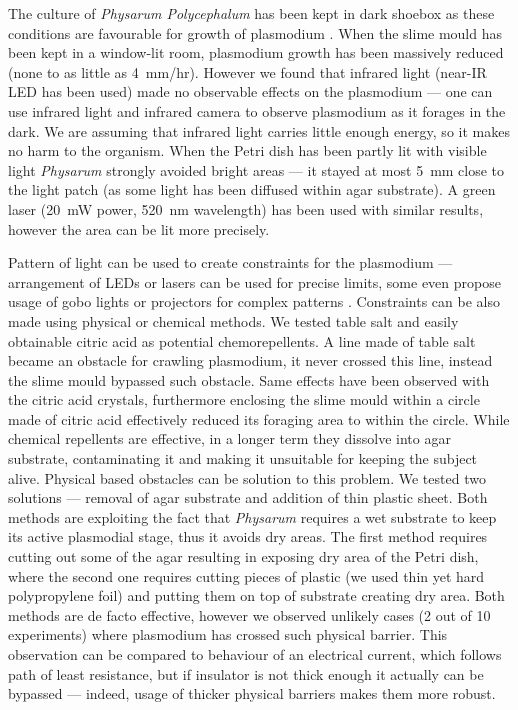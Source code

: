 The culture of \textit{Physarum Polycephalum} has been kept in dark shoebox as these conditions are favourable for growth of plasmodium \cite{adamatzky2010physarum}. When the slime mould has been kept in a window-lit room, plasmodium growth has been massively reduced (none to as little as 4~mm/hr). However we found that infrared light (near-IR LED has been used) made no observable effects on the plasmodium --- one can use infrared light and infrared camera to observe plasmodium as it forages in the dark. We are assuming that infrared light carries little enough energy, so it makes no harm to the organism. When the Petri dish has been partly lit with visible light \textit{Physarum} strongly avoided bright areas --- it stayed at most 5~mm close to the light patch (as some light has been diffused within agar substrate). A green laser (20~mW power, 520~nm wavelength) has been used with similar results, however the area can be lit more precisely. 

Pattern of light can be used to create constraints for the plasmodium --- arrangement of LEDs or lasers can be used for precise limits, some even propose usage of gobo lights or projectors for complex patterns \cite{zhu2013amoeba}. Constraints can be also made using physical or chemical methods. We tested table salt and easily obtainable citric acid as potential chemorepellents. A line made of table salt became an obstacle for crawling plasmodium, it never crossed this line, instead the slime mould bypassed such obstacle. Same effects have been observed with the citric acid crystals, furthermore enclosing the slime mould within a circle made of citric acid effectively reduced its foraging area to within the circle. While chemical repellents are effective, in a longer term they dissolve into agar substrate, contaminating it and making it unsuitable for keeping the subject alive. Physical based obstacles can be solution to this problem. We tested two solutions --- removal of agar substrate and addition of thin plastic sheet. Both methods are exploiting the fact that \textit{Physarum} requires a wet substrate to keep its active plasmodial stage, thus it avoids dry areas. The first method requires cutting out some of the agar resulting in exposing dry area of the Petri dish, where the second one requires cutting pieces of plastic (we used thin yet hard polypropylene foil) and putting them on top of substrate creating dry area. Both methods are de facto effective, however we observed unlikely cases (2 out of 10 experiments) where plasmodium has crossed such physical barrier. This observation can be compared to behaviour of an electrical current, which follows path of least resistance, but if insulator is not thick enough it actually can be bypassed --- indeed, usage of thicker physical barriers makes them more robust. 


